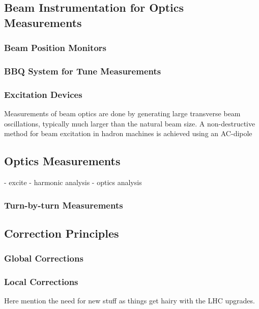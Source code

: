 \subsection{Beam Instrumentation for Optics Measurements}

\subsubsection{Beam Position Monitors}


\subsubsection{BBQ System for Tune Measurements}

\subsubsection{Excitation Devices}


Measurements of beam optics are done by generating large transverse beam oscillations, typically much larger than the natural beam size.
A non-destructive method for beam excitation in hadron machines is achieved using an AC-dipole

\subsection{Optics Measurements}

- excite
- harmonic analysis
- optics analysis

\subsubsection{Turn-by-turn Measurements}

\subsection{Correction Principles}

\subsubsection{Global Corrections}

\subsubsection{Local Corrections}

Here mention the need for new stuff as things get hairy with the LHC upgrades.